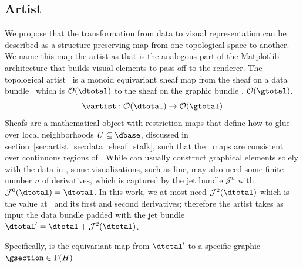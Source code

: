 \documentclass[../main.tex]{subfiles}
\begin{document}
\subsection{Artist}
\label{sec:artist}
We propose that the transformation from data to visual representation can be described as a structure preserving map from one topological space to another. We name this map the artist as that is the analogous part of the  Matplotlib\cite{hunterArchitectureOpenSource} architecture that builds visual elements to pass off to the renderer. The topological artist \vartist\ is a monoid equivariant sheaf map from the sheaf on a data bundle \dtotal\ which is $\mathcal{O}(\dtotal)$ to the sheaf on the graphic bundle \gtotal, $\mathcal{O}(\gtotal)$. 
\begin{equation}
    \vartist: \mathcal{O}(\dtotal) \rightarrow \mathcal{O}(\gtotal)
\end{equation}
Sheafs are a mathematical object with restriction maps that define how to glue \dsection over local neighborhoods $U \subseteq \dbase$,  discussed in section~\ref{sec:artist_sec:data_sheaf_stalk}, such that the \vartist\ maps are consistent over continuous regions of \dbase. While \vartist can usually construct graphical elements solely with the data in \dsection, some visualizations, such as line, may also need some finite number $n$ of derivatives, which is captured by the jet bundle $\mathcal{J}^n$ \cite{JetBundle2020,musilovaCalculusVariationsJet2016} with $\mathcal{J}^{0}(\dtotal)=\dtotal$. In this work, we at most need $\mathcal{J}^{2}(\dtotal)$ which is the value at \dsection\ and its first and second derivatives; therefore the artist takes as input the data bundle padded with the jet bundle $\dtotal^{\prime} = \dtotal + \mathcal{J}^{2}(\dtotal)$. 


Specifically, \vartist is the equivariant map from $\dtotal^{\prime}$ to a specific graphic $\gsection \in \Gamma(H)$ 
\end{document}

